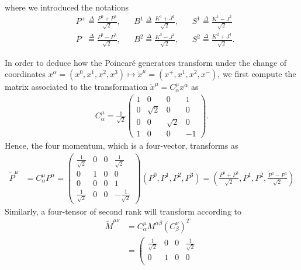 where we introduced the notations
\begin{equation}
\label{lc3}
\begin{aligned}
&  P^+\overset{\Delta}{=}\frac{P^0+P^3}{\sqrt{2}},
&& B^1\overset{\Delta}{=}\frac{K^1+J^2}{\sqrt{2}},
&& S^1\overset{\Delta}{=}\frac{K^1-J^2}{\sqrt{2}}\\
&  P^-\overset{\Delta}{=}\frac{P^0-P^3}{\sqrt{2}},
&& B^2\overset{\Delta}{=}\frac{K^2-J^1}{\sqrt{2}},
&& S^2\overset{\Delta}{=}\frac{K^2+J^1}{\sqrt{2}}.
\end{aligned}
\end{equation}

\begin{note}
\noindent
In order to deduce how the Poincar\'e generators transform under the change of coordinates $x^\alpha=(x^0,x^1,x^2,x^3)\mapsto  \widetilde{x}^\mu=(x^+,x^1,x^2,x^-)$, we first compute the matrix associated to the transformation $\widetilde{x}^\mu=C_\alpha^\mu x^\alpha$ as
\begin{align*}
C_\alpha^\mu=\frac{1}{\sqrt{2}}\left( \begin{array}{cccc}
1 & 0 & 0 & 1\\
0 & \sqrt{2} & 0 & 0\\
0 & 0 & \sqrt{2} & 0\\
1 & 0 & 0 & -1\end{array} \right).
\end{align*}
Hence, the four momentum, which is a four-vector, transforms as
\begin{align*}
\widetilde{P}^\mu&=C_\alpha^\mu P^\alpha=\left( \begin{array}{cccc}
\frac{1}{\sqrt{2}} & 0 & 0 & \frac{1}{\sqrt{2}}\\
0 & 1 & 0 & 0\\
0 & 0 & 0 & 1\\
\frac{1}{\sqrt{2}} & 0 & 0 & -\frac{1}{\sqrt{2}}\end{array} \right)(P^0,P^1,P^2,P^3)=\left(\frac{P^0+P^3}{\sqrt{2}},P^1,P^2,\frac{P^0-P^3}{\sqrt{2}}\right)
\end{align*}
Similarly, a four-tensor of second rank will transform according to
\begin{align*}
\widetilde{M}^{\mu\nu}&=C_\alpha^\mu M^{\alpha\beta}\left(C_\beta^\nu\right)^T\\
&=\left( \begin{array}{cccc}
\frac{1}{\sqrt{2}} & 0 & 0 & \frac{1}{\sqrt{2}}\\
0 & 1 & 0 & 0\\

\end{array}
\end{align*}
\end{note}
